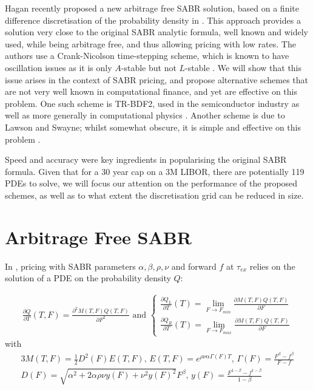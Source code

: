 \documentclass[]{rAMF2e}
\begin{document}
Hagan recently proposed a new arbitrage free SABR solution, based on a finite difference discretisation of the probability density in \citep{hagan2013arbitrage}. This approach provides a solution very close to the original SABR analytic formula, well known and widely used, while being arbitrage free, and thus allowing pricing with low rates. The authors use a Crank-Nicolson time-stepping scheme, which is known to have oscillation issues \citep{duffy2004critique,GiCa2006} as it is only $A$-stable but not $L$-stable \citep{Le07}. We will show that this issue arises in the context of SABR pricing, and propose alternative schemes that are not very well known in computational finance, and yet are effective on this problem. One such scheme is TR-BDF2, used in the semiconductor industry as well as more generally in computational physics \citep{bank1985transient,bathe2005composite,edwards2011nonlinear, flavell2013conservative}. Another scheme is due to Lawson and Swayne; whilst somewhat obscure, it is simple and effective on this problem \citep{lawson1976simple}.  

Speed and accuracy were key ingredients in popularising the original SABR formula. Given that for a 30 year cap on a 3M LIBOR, there are potentially 119 PDEs to solve, we will focus our attention on the performance of the proposed schemes, as well as to what extent the discretisation grid can be reduced in size.



\section{Arbitrage Free SABR}
In \citep{hagan2013arbitrage}, pricing with SABR parameters $\alpha, \beta, \rho, \nu$ and forward $f$ at $\tau_{ex}$ relies on the solution of a PDE on the probability density $Q$:

\begin{align}\label{eqn_pde}
\frac{\partial Q}{\partial T}(T,F) = \frac{\partial^2 M(T,F) Q(T,F)}{\partial F^2} \text{ and } \begin{cases}
\frac{\partial Q_L}{\partial T}(T) = \lim_{F \to F_{min}} \frac{\partial M(T,F) Q(T,F)}{\partial F}\\
\frac{\partial Q_R}{\partial T}(T) = \lim_{F \to F_{max}} \frac{\partial M(T,F) Q(T,F)}{\partial F}
\end{cases}
\end{align}
with
\begin{alignat}{3}
M(T,F) = \frac{1}{2} D^2(F) E(T,F) \text{, } E(T,F) = e^{\rho\nu\alpha\Gamma(F) T} \text{, } \Gamma(F) = \frac{F^{\beta}-f^{\beta}}{F-f}\\
D(F) = \sqrt{\alpha^2 +2\alpha\rho\nu y(F)+ \nu^2 y(F)^2} F^{\beta} \text{, } y(F) = \frac{F^{1-\beta}-f^{1-\beta}}{1-\beta}
\end{alignat}
\end{document}
